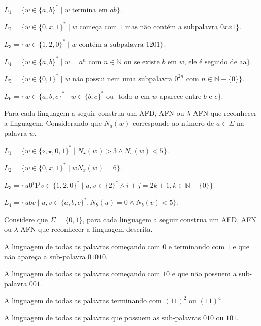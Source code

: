 \begin{exerList}
	\item $L_1 = \{w \in \{a,b\}^* \mid w \text{ termina em } ab\}$.
  \item $L_2 = \{w \in \{0, x, 1\}^* \mid w \text{ começa com } 1 \text{ mas não contém a subpalavra } 0xx1 \}$.
  \item $L_3 = \{w \in \{1, 2, 0\}^* \mid w \text{ contém a subpalavra } 1201\}$.
  \item $L_4 = \{w \in \{a,b\}^* \mid w = a^n \text{ com } n \in \mathbb{N} \text{ ou se existe } b \text{ em } w \text{, ele é seguido de aa}\}$.
  \item $L_5 = \{w \in \{0,1\}^* \mid w \text{ não possui nem uma subpalavra } 0^{2n} \text{ com } n \in \mathbb{N} - \{0\}\}$.
  \item $L_6 = \{w \in \{a,b, c\}^* \mid w \in \{b, c\}^* \text{ ou } \text{ todo } a \text{ em } w \text{ aparece entre } b \text{ e } c\}$.
\end{exerList}

\begin{questao}\label{exer:AF2}
	Para cada linguagem a seguir construa um AFD, AFN ou $\lambda$-AFN que reconhecer a linguagem. Considerando que $N_a(w)$ corresponde ao número de $a \in \Sigma$ na palavra $w$.
\end{questao}

\begin{exerList}
	\item $L_1 = \{w \in \{\circ, \star, 0, 1\}^* \mid N_\star(w) > 3 \land N_\circ(w) < 5\}$.
  \item $L_2 = \{w \in \{0, x, 1\}^* \mid w N_x(w) = 6\}$.
  \item $L_3 = \{u0^i1^jv \in \{1, 2, 0\}^* \mid u, v \in \{2\}^* \land  i + j = 2k + 1, k \in \mathbb{N}-\{0\}\}$.
	\item $L_4 = \{ubv \mid u, v \in \{a, b, c\}^*, N_b(u) = 0 \land N_b(v) < 5\}$.
\end{exerList}

\begin{questao}\label{exer:AF3}
	Considere que $\Sigma = \{0, 1\}$, para cada linguagem a seguir construa um AFD, AFN ou $\lambda$-AFN que reconhecer a linguagem descrita.
\end{questao}

\begin{exerList}
	\item A linguagem de todas as palavras começando com $0$ e terminando com $1$ e que não apareça a sub-palavra $01010$.
	\item A linguagem de todas as palavras começando com $10$ e que não possuem a sub-palavra $001$.
	\item A linguagem de todas as palavras terminando com $(11)^2$ ou $(11)^4$. 
	\item A linguagem de todas as palavras que possuem as sub-palavras $010$ ou $101$.
\end{exerList}

